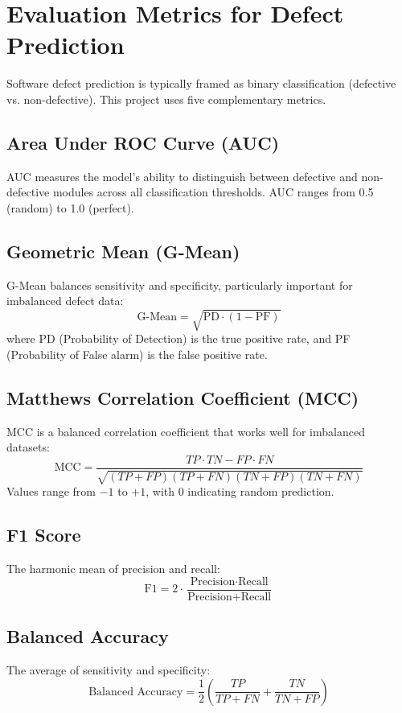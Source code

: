 \section{Evaluation Metrics for Defect Prediction}

Software defect prediction is typically framed as binary classification (defective vs. non-defective). This project uses five complementary metrics.

\subsection{Area Under ROC Curve (AUC)}
AUC measures the model's ability to distinguish between defective and non-defective modules across all classification thresholds. AUC ranges from 0.5 (random) to 1.0 (perfect).

\subsection{Geometric Mean (G-Mean)}
G-Mean balances sensitivity and specificity, particularly important for imbalanced defect data:
\[
\text{G-Mean} = \sqrt{\text{PD} \cdot (1 - \text{PF})}
\]
where PD (Probability of Detection) is the true positive rate, and PF (Probability of False alarm) is the false positive rate.

\subsection{Matthews Correlation Coefficient (MCC)}
MCC is a balanced correlation coefficient that works well for imbalanced datasets:
\[
\text{MCC} = \frac{TP \cdot TN - FP \cdot FN}{\sqrt{(TP+FP)(TP+FN)(TN+FP)(TN+FN)}}
\]
Values range from \(-1\) to \(+1\), with 0 indicating random prediction.

\subsection{F1 Score}
The harmonic mean of precision and recall:
\[
\text{F1} = 2 \cdot \frac{\text{Precision} \cdot \text{Recall}}{\text{Precision} + \text{Recall}}
\]

\subsection{Balanced Accuracy}
The average of sensitivity and specificity:
\[
\text{Balanced Accuracy} = \frac{1}{2}\left(\frac{TP}{TP+FN} + \frac{TN}{TN+FP}\right)
\]

